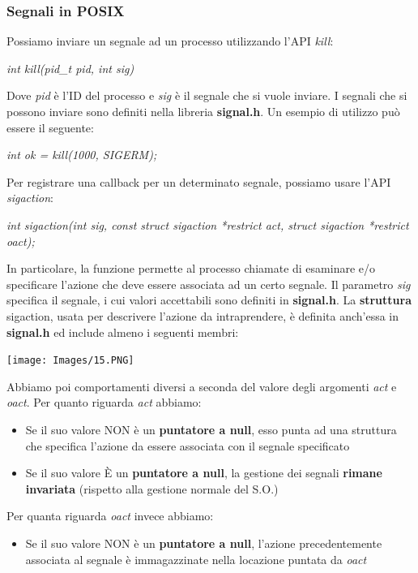 \documentclass[12pt]{article}
\begin{document}
\subsubsection{Segnali in POSIX}
Possiamo inviare un segnale ad un processo utilizzando l'API \textit{kill}:
\begin{center}
    \textit{int kill(pid\_t pid, int sig)}
\end{center}
Dove \textit{pid} è l'ID del processo e \textit{sig} è il segnale che si vuole inviare.
I segnali che si possono inviare sono definiti nella libreria \textbf{signal.h}.
Un esempio di utilizzo può essere il seguente:
\begin{center}
    \textit{int ok = kill(1000, SIGERM);}
\end{center}
Per registrare una callback per un determinato segnale, possiamo usare l'API \textit{sigaction}:
\begin{center}
    \textit{int sigaction(int sig, const struct sigaction *restrict act, struct sigaction *restrict oact);}
\end{center}
In particolare, la funzione permette al processo chiamate di esaminare e/o specificare l'azione che deve essere associata ad un certo segnale.
Il parametro \textit{sig} specifica il segnale, i cui valori accettabili sono definiti in \textbf{signal.h}. La \textbf{struttura} sigaction, usata per
descrivere l'azione da intraprendere, è definita anch'essa in \textbf{signal.h} ed include almeno i seguenti membri:
\begin{center}
    \texttt{[image: Images/15.PNG]}
\end{center}
Abbiamo poi comportamenti diversi a seconda del valore degli argomenti \textit{act} e \textit{oact}. Per quanto
riguarda \textit{act} abbiamo:
\begin{itemize}
    \item Se il suo valore NON è un \textbf{puntatore a null}, esso punta ad una struttura che specifica l'azione da essere associata con il segnale specificato
    \item Se il suo valore È un \textbf{puntatore a null}, la gestione dei segnali \textbf{rimane invariata} (rispetto alla gestione normale del S.O.)
\end{itemize}
Per quanta riguarda \textit{oact} invece abbiamo:
\begin{itemize}
    \item Se il suo valore NON è un \textbf{puntatore a null}, l'azione precedentemente associata al segnale è immagazzinate nella locazione puntata da \textit{oact}
\end{itemize}
\end{document}
